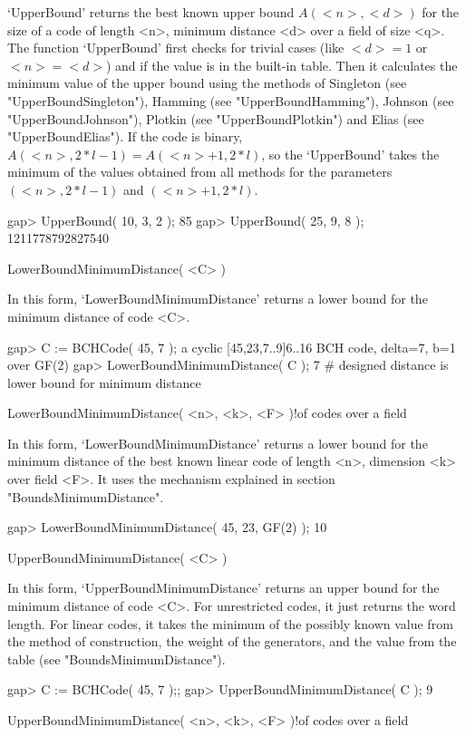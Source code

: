 `UpperBound' returns the best known upper bound $A(<n>,<d>)$ for the size
of a code of length <n>, minimum  distance <d> over a  field of size <q>.
The function `UpperBound' first checks for trivial cases (like $<d>=1$ or
$<n>=<d>$) and if the value is in the  built-in table. Then it calculates
the minimum value of the upper bound using the  methods of Singleton (see
"UpperBoundSingleton"),  Hamming (see "UpperBoundHamming"), Johnson  (see
"UpperBoundJohnson"), Plotkin  (see  "UpperBoundPlotkin")  and Elias (see
"UpperBoundElias").  If the code is   binary, $A(<n>, 2*l-1) =  A(<n>+1,
2*l)$, so the `UpperBound' takes the minimum of the values obtained from
all methods for the parameters $(<n>, 2*l-1)$ and $(<n>+1, 2*l)$.

\beginexample
gap> UpperBound( 10, 3, 2 );
85
gap> UpperBound( 25, 9, 8 );
1211778792827540 
\endexample

\>LowerBoundMinimumDistance( <C> )

In this form, `LowerBoundMinimumDistance'  returns a lower bound for  the
minimum distance of code <C>.

\beginexample
gap> C := BCHCode( 45, 7 );
a cyclic [45,23,7..9]6..16 BCH code, delta=7, b=1 over GF(2)
gap> LowerBoundMinimumDistance( C );
7     # designed distance is lower bound for minimum distance 
\endexample

\>LowerBoundMinimumDistance( <n>, <k>, <F> )!{of codes over a field}

In this  form, `LowerBoundMinimumDistance' returns a  lower bound for the
minimum distance of  the best known linear  code of length <n>, dimension
<k>   over  field <F>.   It  uses the   mechanism   explained in  section
"BoundsMinimumDistance".

\beginexample
gap> LowerBoundMinimumDistance( 45, 23, GF(2) );
10 
\endexample

\>UpperBoundMinimumDistance( <C> )

In this form, `UpperBoundMinimumDistance'  returns an upper bound for the
minimum distance of code <C>. For unrestricted codes, it just returns the
word length. For linear codes, it takes the minimum of the possibly known
value from the method of construction,  the weight of the generators, and
the value from the table (see "BoundsMinimumDistance").

\beginexample
gap> C := BCHCode( 45, 7 );;
gap> UpperBoundMinimumDistance( C );
9 
\endexample

\>UpperBoundMinimumDistance( <n>, <k>, <F> )!{of codes over a field}

